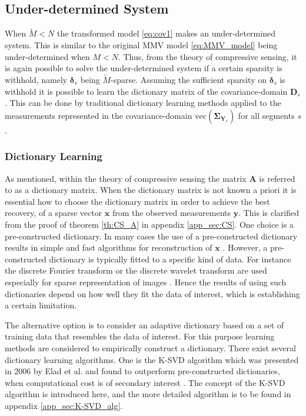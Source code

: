 \subsection{Under-determined System}\label{sec:cov1}
When $\widetilde{M} < N$ the transformed model \eqref{eq:cov1} makes an under-determined system. 
This is similar to the original MMV model \eqref{eq:MMV_model} being under-determined when $M < N$. 
Thus, from the theory of compressive sensing, it is again possible to solve the under-determined system if a certain sparsity is withhold, namely $\boldsymbol{\delta}_s$ being $\widetilde{M}$-sparse.
Assuming the sufficient sparsity on $\boldsymbol{\delta}_s$ is withhold it is possible to learn the dictionary matrix of the covariance-domain $\mathbf{D}_s$. 
This can be done by traditional dictionary learning methods applied to the measurements represented in the covariance-domain $\text{vec}\left(\widehat{\boldsymbol{\Sigma}}_{\mathbf{Y}_s}\right)$ for all segments $s$.

\subsubsection{Dictionary Learning}\label{sec:dictionarylearning}
As mentioned, within the theory of compressive sensing the matrix $\mathbf{A}$ is referred to as a dictionary matrix. 
When the dictionary matrix is not known a priori it is essential how to choose the dictionary matrix in order to achieve the best recovery, of a sparse vector $\mathbf{x}$ from the observed measurements $\mathbf{y}$. 
This is clarified from the proof of theorem \ref{th:CS_A} in appendix \ref{app_sec:CS}. 
One choice is a pre-constructed dictionary. 
In many cases the use of a pre-constructed dictionary results in simple and fast algorithms for reconstruction of $\mathbf{x}$ \cite{Elad_book}. 
However, a pre-constructed dictionary is typically fitted to a specific kind of data. 
For instance the discrete Fourier transform or the discrete wavelet transform are used especially for sparse representation of images \cite{Elad_book}. 
Hence the results of using such dictionaries depend on how well they fit the data of interest, which is establishing a certain limitation. 

The alternative option is to consider an adaptive dictionary based on a set of training data that resembles the data of interest. 
For this purpose learning methods are considered to empirically construct a dictionary. 
There exist several dictionary learning algorithms. One is the K-SVD algorithm which was presented in 2006 by Elad et al. and found to outperform pre-constructed dictionaries, when computational cost is of secondary interest \cite{Elad2006}. 
The concept of the K-SVD algorithm is introduced here, and the more detailed algorithm is to be found in appendix \ref{app_sec:K-SVD_alg}. 

